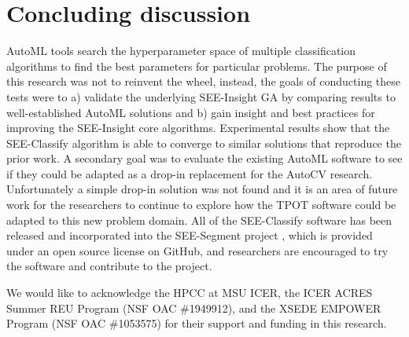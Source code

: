 \documentclass[acmsmall,screen]{acmart}
\begin{document}
\section{Concluding discussion}
AutoML tools search the hyperparameter space of multiple classification algorithms to find the best parameters for particular problems. The purpose of this research was not to reinvent the wheel, instead, the goals of conducting these tests were to a) validate the underlying SEE-Insight GA by comparing results to well-established AutoML solutions and b) gain insight and best practices for improving the SEE-Insight core algorithms.  Experimental results show that the SEE-Classify algorithm is able to converge to similar solutions that reproduce the prior work. A secondary goal was to evaluate the existing AutoML software to see if they could be adapted as a drop-in replacement for the AutoCV research. Unfortunately a simple drop-in solution was not found and it is an area of future work for the researchers to continue to explore how the TPOT software could be adapted to this new problem domain.  All of the SEE-Classify software has been released and incorporated into the SEE-Segment project \cite{see-segment}, which is provided under an open source license on GitHub, and researchers are encouraged to try the software and contribute to the project. 

\begin{acks}
We would like to acknowledge the HPCC at MSU ICER, the ICER ACRES Summer REU Program (NSF OAC \#1949912), and the XSEDE EMPOWER Program (NSF OAC \#1053575) for their support and funding in this research.

\end{acks}






\end{document}
